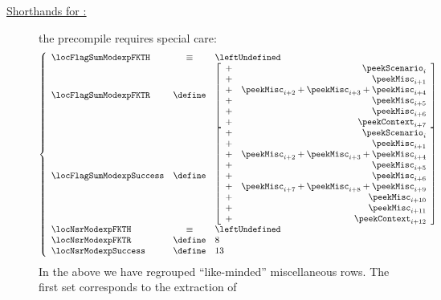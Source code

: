\begin{description}
	\item[\underline{\underline{Shorthands for \instModexp{}:}}] the \instModexp{} precompile requires special care:
		\[
			\left\{ \begin{array}{lcl}
				\locFlagSumModexpFKTH & \equiv  & \leftUndefined \\
				\locFlagSumModexpFKTR & \define &
				\left[ \begin{array}{cr}
					+ & \peekScenario _{i     } \\
					+ & \peekMisc     _{i +  1} \\
					+ & \peekMisc     _{i +  2} 
					+   \peekMisc     _{i +  3} 
					+   \peekMisc     _{i +  4} \\
					+ & \peekMisc     _{i +  5} \\
					+ & \peekMisc     _{i +  6} \\
					+ & \peekContext  _{i +  7} \\
				\end{array} \right] \\
				\locFlagSumModexpSuccess & \define &
				\left[ \begin{array}{cr}
					+ & \peekScenario _{i     } \\
					+ & \peekMisc     _{i +  1} \\
					+ & \peekMisc     _{i +  2} 
					+   \peekMisc     _{i +  3} 
					+   \peekMisc     _{i +  4} \\
					+ & \peekMisc     _{i +  5} \\
					+ & \peekMisc     _{i +  6} \\
					+ & \peekMisc     _{i +  7} 
					+   \peekMisc     _{i +  8} 
					+   \peekMisc     _{i +  9} \\
					+ & \peekMisc     _{i + 10} \\
					+ & \peekMisc     _{i + 11} \\
					+ & \peekContext  _{i + 12} \\
				\end{array} \right] \\
				\locNsrModexpFKTH    & \equiv  & \leftUndefined \\
				\locNsrModexpFKTR    & \define & 8              \\
				\locNsrModexpSuccess & \define & 13             \\
			\end{array} \right.
		\]
		In the above we have regrouped ``like-minded'' miscellaneous rows.
		The first set corresponds to the extraction of

\end{description}
